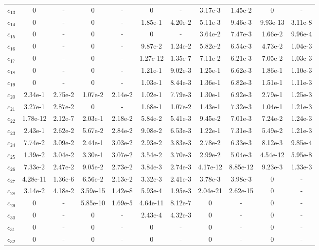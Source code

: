\begin{table}[p]
{\begin{tabular}{lcc@{\hspace{16pt}}cc@{\hspace{16pt}}cc@{\hspace{16pt}}cc@{\hspace{16pt}}cc}
$c_{13}$ & 0 & - & 0 & - & 0 & - & 3.17e-3 & 1.45e-2 & 0 & - \\
$c_{14}$ & 0 & - & 0 & - & 1.85e-1 & 4.20e-2 & 5.11e-3 & 9.46e-3 & 9.93e-13 & 3.11e-8 \\
$c_{15}$ & 0 & - & 0 & - & 0 & - & 3.64e-2 & 7.47e-3 & 1.66e-2 & 9.96e-4 \\
$c_{16}$ & 0 & - & 0 & - & 9.87e-2 & 1.24e-2 & 5.82e-2 & 6.54e-3 & 4.73e-2 & 1.04e-3 \\
$c_{17}$ & 0 & - & 0 & - & 1.27e-12 & 1.35e-7 & 7.11e-2 & 6.21e-3 & 7.05e-2 & 1.03e-3 \\
$c_{18}$ & 0 & - & 0 & - & 1.21e-1 & 9.02e-3 & 1.25e-1 & 6.62e-3 & 1.86e-1 & 1.10e-3 \\
$c_{19}$ & 0 & - & 0 & - & 1.03e-1 & 8.44e-3 & 1.36e-1 & 6.82e-3 & 1.51e-1 & 1.11e-3 \\
$c_{20}$ & 2.34e-1 & 2.75e-2 & 1.07e-2 & 2.14e-2 & 1.02e-1 & 7.79e-3 & 1.30e-1 & 6.92e-3 & 2.79e-1 & 1.25e-3 \\
$c_{21}$ & 3.27e-1 & 2.87e-2 & 0 & - & 1.68e-1 & 1.07e-2 & 1.43e-1 & 7.32e-3 & 1.04e-1 & 1.21e-3 \\
$c_{22}$ & 1.78e-12 & 2.12e-7 & 2.03e-1 & 2.18e-2 & 5.84e-2 & 5.41e-3 & 9.45e-2 & 7.01e-3 & 7.24e-2 & 1.24e-3 \\
$c_{23}$ & 2.43e-1 & 2.62e-2 & 5.67e-2 & 2.84e-2 & 9.08e-2 & 6.53e-3 & 1.22e-1 & 7.31e-3 & 5.49e-2 & 1.21e-3 \\
$c_{24}$ & 7.74e-2 & 3.09e-2 & 2.44e-1 & 3.03e-2 & 2.93e-2 & 3.83e-3 & 2.78e-2 & 6.33e-3 & 8.12e-3 & 9.85e-4 \\
$c_{25}$ & 1.39e-2 & 3.04e-2 & 3.30e-1 & 3.07e-2 & 3.54e-2 & 3.70e-3 & 2.99e-2 & 5.04e-3 & 4.54e-12 & 5.95e-8 \\
$c_{26}$ & 7.33e-2 & 2.47e-2 & 9.05e-2 & 2.73e-2 & 3.84e-3 & 2.74e-3 & 4.17e-12 & 8.85e-12 & 9.23e-3 & 1.33e-3 \\
$c_{27}$ & 4.28e-11 & 1.36e-6 & 6.56e-2 & 2.13e-2 & 3.32e-3 & 2.41e-3 & 3.78e-3 & 3.98e-3 & 0 & - \\
$c_{28}$ & 3.14e-2 & 4.18e-2 & 3.59e-15 & 1.42e-8 & 5.93e-4 & 1.95e-3 & 2.04e-21 & 2.62e-15 & 0 & - \\
$c_{29}$ & 0 & - & 5.85e-10 & 1.69e-5 & 4.64e-11 & 8.12e-7 & 0 & - & 0 & - \\
$c_{30}$ & 0 & - & 0 & - & 2.43e-4 & 4.32e-3 & 0 & - & 0 & - \\
$c_{31}$ & 0 & - & 0 & - & 0 & - & 0 & - & 0 & - \\
$c_{32}$ & 0 & - & 0 & - & 0 & - & 0 & - & 0 & - \\
\bottomrule
\end{tabular}}
\endgroup
\end{table}
\clearpage

